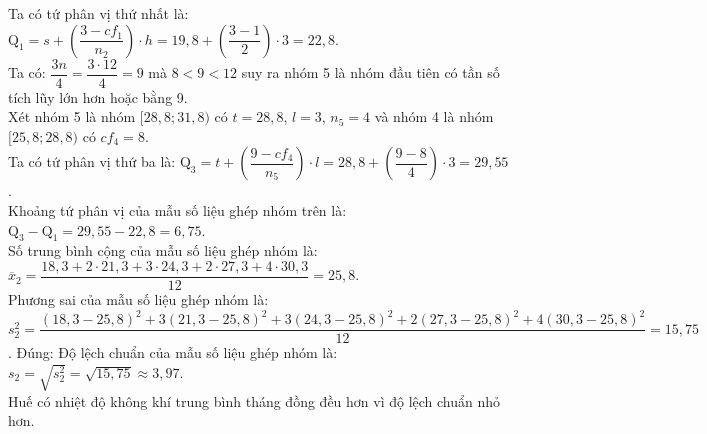 \begin{ex}
{\begin{itemchoice}
			Ta có tứ phân vị thứ  nhất là: $\mathrm{Q}_1=s+\left(\dfrac{3-cf_1}{n_2}\right)\cdot h =19{,}8+\left(\dfrac{3-1}{2}\right)\cdot 3 =22{,}8$.\\
			Ta có: $\dfrac{3n}{4}=\dfrac{3\cdot  12}{4}=9$ mà $8<9<12$ suy ra nhóm 5 là nhóm đầu tiên có tần số tích lũy lớn hơn hoặc bằng 9. \\
			Xét  nhóm 5 là nhóm $[28{,}8;31{,}8)$ có $t=28{,}8$, $l=3$, $n_5=4$ và nhóm 4 là nhóm $[25{,}8;28{,}8)$ có $cf_4=8$.\\
			Ta có tứ  phân vị thứ ba là: $\mathrm{Q}_3=t+\left(\dfrac{9-cf_4}{n_5}\right)\cdot l =28{,}8+\left(\dfrac{9-8}{4}\right)\cdot 3 =29{,}55$.\\
			Khoảng  tứ phân vị của mẫu số liệu ghép nhóm trên là: $\mathrm{Q}_3-\mathrm{Q}_1=29{,}55-22{,}8=6{,}75$.\\
			Số  trung bình cộng của mẫu số liệu ghép nhóm là: \\
			$\overline{x}_2=\dfrac{18{,}3+2\cdot 21{,}3+3\cdot  24{,}3+2\cdot 27{,}3+4\cdot 30{,}3}{12} =25{,}8$.\\
			Phương sai của mẫu số liệu  ghép nhóm là:\\
			$s_2^2=\dfrac{(18{,}3-25{,}8)^2+3(21{,}3-25{,}8)^2+3(24{,}3-25{,}8)^2+2(27{,}3-25{,}8)^2+4(30{,}3-25{,}8)^2}{12}=15{,}75$. 
			\itemch Đúng: Độ lệch chuẩn của mẫu số liệu ghép  nhóm là: $s_2=\sqrt{s_2^2}=\sqrt{15{,}75}\approx 3{,}97$.\\
			Huế có nhiệt độ không khí trung bình tháng đồng đều hơn  vì độ lệch chuẩn nhỏ hơn.
		\end{itemchoice}
	 }
\end{ex}

